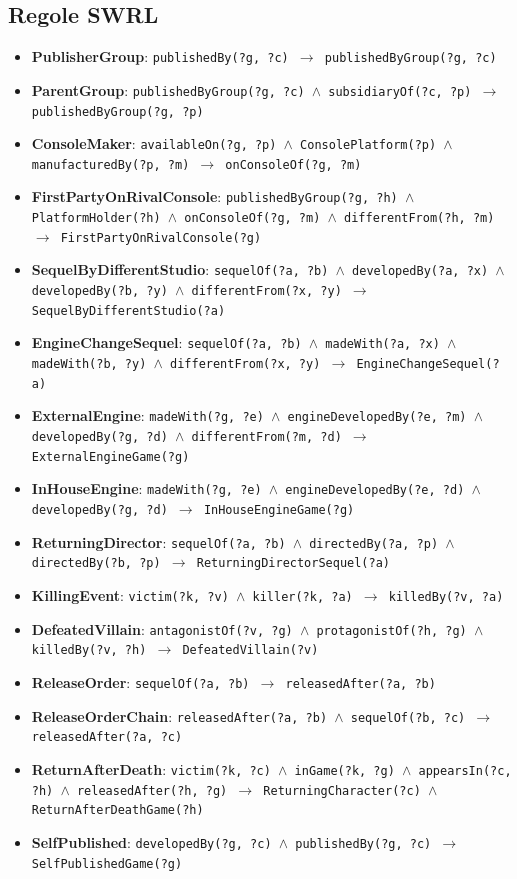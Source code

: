 \subsection*{Regole SWRL}
\begin{itemize}\footnotesize
\item \textbf{PublisherGroup}: \texttt{publishedBy(?g, ?c) $\rightarrow$ publishedByGroup(?g, ?c)}
\item \textbf{ParentGroup}: \texttt{publishedByGroup(?g, ?c) $\wedge$ subsidiaryOf(?c, ?p) $\rightarrow$ publishedByGroup(?g, ?p)}
\item \textbf{ConsoleMaker}: \texttt{availableOn(?g, ?p) $\wedge$ ConsolePlatform(?p) $\wedge$ manufacturedBy(?p, ?m) $\rightarrow$ onConsoleOf(?g, ?m)}
\item \textbf{FirstPartyOnRivalConsole}: \texttt{publishedByGroup(?g, ?h) $\wedge$ PlatformHolder(?h) $\wedge$ onConsoleOf(?g, ?m) $\wedge$ differentFrom(?h, ?m) $\rightarrow$ FirstPartyOnRivalConsole(?g)}
\item \textbf{SequelByDifferentStudio}: \texttt{sequelOf(?a, ?b) $\wedge$ developedBy(?a, ?x) $\wedge$ developedBy(?b, ?y) $\wedge$ differentFrom(?x, ?y) $\rightarrow$ SequelByDifferentStudio(?a)}
\item \textbf{EngineChangeSequel}: \texttt{sequelOf(?a, ?b) $\wedge$ madeWith(?a, ?x) $\wedge$ madeWith(?b, ?y) $\wedge$ differentFrom(?x, ?y) $\rightarrow$ EngineChangeSequel(?a)}
\item \textbf{ExternalEngine}: \texttt{madeWith(?g, ?e) $\wedge$ engineDevelopedBy(?e, ?m) $\wedge$ developedBy(?g, ?d) $\wedge$ differentFrom(?m, ?d) $\rightarrow$ ExternalEngineGame(?g)}
\item \textbf{InHouseEngine}: \texttt{madeWith(?g, ?e) $\wedge$ engineDevelopedBy(?e, ?d) $\wedge$ developedBy(?g, ?d) $\rightarrow$ InHouseEngineGame(?g)}
\item \textbf{ReturningDirector}: \texttt{sequelOf(?a, ?b) $\wedge$ directedBy(?a, ?p) $\wedge$ directedBy(?b, ?p) $\rightarrow$ ReturningDirectorSequel(?a)}
\item \textbf{KillingEvent}: \texttt{victim(?k, ?v) $\wedge$ killer(?k, ?a) $\rightarrow$ killedBy(?v, ?a)}
\item \textbf{DefeatedVillain}: \texttt{antagonistOf(?v, ?g) $\wedge$ protagonistOf(?h, ?g) $\wedge$ killedBy(?v, ?h) $\rightarrow$ DefeatedVillain(?v)}
\item \textbf{ReleaseOrder}: \texttt{sequelOf(?a, ?b) $\rightarrow$ releasedAfter(?a, ?b)}
\item \textbf{ReleaseOrderChain}: \texttt{releasedAfter(?a, ?b) $\wedge$ sequelOf(?b, ?c) $\rightarrow$ releasedAfter(?a, ?c)}
\item \textbf{ReturnAfterDeath}: \texttt{victim(?k, ?c) $\wedge$ inGame(?k, ?g) $\wedge$ appearsIn(?c, ?h) $\wedge$ releasedAfter(?h, ?g) $\rightarrow$ ReturningCharacter(?c) $\wedge$ ReturnAfterDeathGame(?h)}
\item \textbf{SelfPublished}: \texttt{developedBy(?g, ?c) $\wedge$ publishedBy(?g, ?c) $\rightarrow$ SelfPublishedGame(?g)}
\end{itemize}

